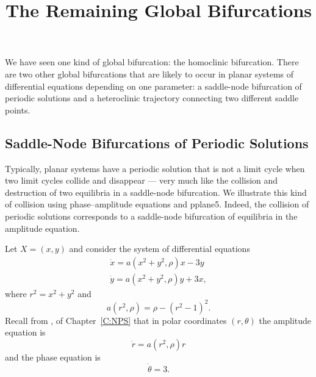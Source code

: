 \documentclass{ximera}
\title{The Remaining Global Bifurcations}
\begin{document}
\begin{abstract}
\end{abstract}
\maketitle

 
\label{S:GlobalBif}

We have seen one kind of global bifurcation: the homoclinic bifurcation. 
There are two other global bifurcations that are likely to occur in planar 
systems of differential equations depending on one parameter:  a saddle-node
bifurcation of periodic solutions and a heteroclinic trajectory connecting two
different saddle points.

\subsection*{Saddle-Node Bifurcations of Periodic Solutions}

Typically, planar systems have a periodic solution that is not a limit cycle 
when two limit cycles collide and disappear --- very much like the collision 
and destruction of two equilibria in a saddle-node bifurcation.  We illustrate 
this kind of collision using phase--amplitude equations and {\sf pplane5}.
Indeed, the collision of periodic solutions corresponds to a saddle-node 
bifurcation of equilibria in the amplitude equation.

Let $X=(x,y)$ and consider the system of differential equations 
\begin{equation*}  \label{e:papp}
\begin{array}{rcl}
\dot{x} = a(x^2+y^2,\rho)x - 3y \\
\dot{y} = a(x^2+y^2,\rho)y + 3x,
\end{array}
\end{equation*}
where $r^2=x^2+y^2$ and
\begin{equation}  \label{e:app}  
a(r^2,\rho) = \rho - (r^2-1)^2.
\end{equation} 
Recall from , of Chapter~\ref{C:NPS}
that in polar coordinates $(r,\theta)$ the 
amplitude equation is 
\[
\dot{r} = a(r^2,\rho)r
\]
and the phase equation is
\[
\dot{\theta} = 3.
\]
\end{document}
